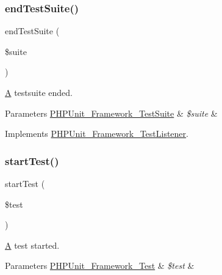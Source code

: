 \subsubsection{\texorpdfstring{end\+Test\+Suite()}{endTestSuite()}}
{\footnotesize\ttfamily end\+Test\+Suite (\begin{DoxyParamCaption}\item[{\mbox{\hyperlink{class_p_h_p_unit___framework___test_suite}{P\+H\+P\+Unit\+\_\+\+Framework\+\_\+\+Test\+Suite}}}]{\$suite }\end{DoxyParamCaption})}

\mbox{\hyperlink{class_a}{A}} testsuite ended.


\begin{DoxyParams}[1]{Parameters}
\mbox{\hyperlink{class_p_h_p_unit___framework___test_suite}{P\+H\+P\+Unit\+\_\+\+Framework\+\_\+\+Test\+Suite}} & {\em \$suite} & \\
\hline
\end{DoxyParams}


Implements \mbox{\hyperlink{interface_p_h_p_unit___framework___test_listener_aeec28a4d1328434916ebcdc1ca6b5527}{P\+H\+P\+Unit\+\_\+\+Framework\+\_\+\+Test\+Listener}}.

\mbox{\label{class_p_h_p_unit___util___log___j_s_o_n_a1a9bddc54f26bb3fb5c2ec9778ea5198}} 
\subsubsection{\texorpdfstring{start\+Test()}{startTest()}}
{\footnotesize\ttfamily start\+Test (\begin{DoxyParamCaption}\item[{\mbox{\hyperlink{interface_p_h_p_unit___framework___test}{P\+H\+P\+Unit\+\_\+\+Framework\+\_\+\+Test}}}]{\$test }\end{DoxyParamCaption})}

\mbox{\hyperlink{class_a}{A}} test started.


\begin{DoxyParams}[1]{Parameters}
\mbox{\hyperlink{interface_p_h_p_unit___framework___test}{P\+H\+P\+Unit\+\_\+\+Framework\+\_\+\+Test}} & {\em \$test} & \\
\hline
\end{DoxyParams}


